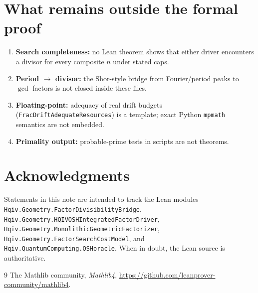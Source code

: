\documentclass[11pt,a4paper]{article}
\theoremstyle{plain}
\theoremstyle{definition}
\theoremstyle{remark}
\begin{document}
\section{What remains outside the formal proof}

\begin{enumerate}[label=\textbf{G\arabic*.}]
\item \textbf{Search completeness:} no Lean theorem shows that either driver
      encounters a divisor for every composite $n$ under stated caps.
\item \textbf{Period $\to$ divisor:} the Shor-style bridge from Fourier/period peaks
      to $\gcd$ factors is not closed inside these files.
\item \textbf{Floating-point:} adequacy of real drift budgets (\texttt{FracDriftAdequateResources})
      is a template; exact Python \texttt{mpmath} semantics are not embedded.
\item \textbf{Primality output:} probable-prime tests in scripts are not theorems.
\end{enumerate}

\section*{Acknowledgments}

Statements in this note are intended to track the Lean modules
\texttt{Hqiv.Geometry.FactorDivisibilityBridge},
\texttt{Hqiv.Geometry.HQIVOSHIntegratedFactorDriver},
\texttt{Hqiv.Geometry.MonolithicGeometricFactorizer},
\texttt{Hqiv.Geometry.FactorSearchCostModel}, and
\texttt{Hqiv.QuantumComputing.OSHoracle}. When in doubt, the Lean source is authoritative.

\begin{thebibliography}{9}
The Mathlib community, \emph{Mathlib4}, \url{https://github.com/leanprover-community/mathlib4}.
\end{thebibliography}
\end{document}
